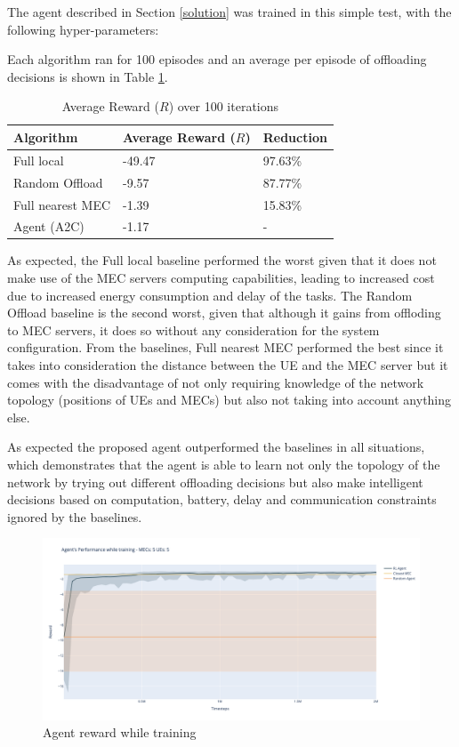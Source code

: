 The agent described in Section \ref{solution} was trained in this simple test, with the following hyper-parameters:

Each algorithm ran for 100 episodes and an average per episode of offloading decisions is shown in Table \ref{resultstest1}.

\begin{table}[H]
\centering
\begin{tabular}{|l|l|l|}
\hline
Algorithm        & Average Reward ($R$) & Reduction\\ \hline
Full local       & -49.47 & 97.63\%\\
Random Offload   & -9.57 & 87.77\%\\
Full nearest MEC & -1.39 & 15.83\%\\ 
Agent (A2C) & -1.17 & -\\ \hline
\end{tabular}
\caption{Average Reward ($R$) over 100 iterations} \label{resultstest1}
\end{table}

As expected, the Full local baseline performed the worst given that it does not make use of the \acrshort{MEC} servers computing capabilities, leading to increased cost due to increased energy consumption and delay of the tasks. The Random Offload baseline is the second worst, given that although it gains from offloding to \acrshort{MEC} servers, it does so without any consideration for the system configuration. From the baselines, Full nearest MEC performed the best since it takes into consideration the distance between the \acrshort{UE} and the \acrshort{MEC} server but it comes with the disadvantage of not only requiring knowledge of the network topology (positions of \acrshort{UE}s and \acrshort{MEC}s) but also not taking into account anything else. 

As expected the proposed agent outperformed the baselines in all situations, which demonstrates that the agent is able to learn not only the topology of the network by trying out different offloading decisions but also make intelligent decisions based on computation, battery, delay and communication constraints ignored by the baselines.

\begin{figure}[H]
  \centering
  \includegraphics[width=\textwidth]{images/5_5_training.png}
  \caption{Agent reward while training}  \label{5_5_training}
\end{figure}

